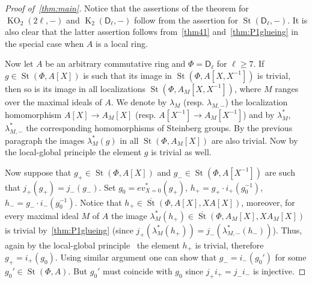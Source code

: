\documentclass[oneside, 8pt]{amsart}
\theoremstyle{remark}
\theoremstyle{definition}
\numberwithin{lemma}{section}
\numberwithin{prop}{section}
\numberwithin{corollary}{section}
\numberwithin{externaltheorem}{section}
\DeclareMathOperator{\St}{St}
\DeclareMathOperator{\K}{K}
\DeclareMathOperator{\KO}{KO}
\newcommand{\inv}{^{-1}}
\newcommand{\rD}{\mathsf{D}}
\numberwithin{equation}{section}
\begin{document}
\begin{proof}[Proof of~\cref{thm:main}]
 Notice that the assertions of the theorem for $\KO_2(2\ell, -)$ and $\K_2(\rD_\ell, -)$ follow from the assertion for $\St(\rD_\ell, -)$. It is also clear that the latter assertion follows from~\cref{thm41} and~\cref{thm:P1glueing} in the special case when $A$ is a local ring.
 
 Now let $A$ be an arbitrary commutative ring and $\Phi = \rD_\ell$ for $\ell \geq 7$. If $g \in \St(\Phi, A[X])$ is such that its image in $\St(\Phi, A[X, X\inv])$ is trivial, then so is its image in all localizations $\St(\Phi, A_M[X, X\inv])$, where $M$ ranges over the maximal ideals of $A$.
 We denote by $\lambda_{M}$ (resp. $\lambda_{M, -}$) the localization homomorphism $A[X] \to A_M[X]$ (resp. $A[X\inv] \to A_M[X\inv]$) and by $\lambda_M^*$, $\lambda_{M,-}^*$ the corresponding homomorphisms of Steinberg groups.
 By the previous paragraph the images $\lambda^*_M(g)$ in all $\St(\Phi, A_M[X])$ are also trivial. Now by the local-global principle \cite[Theorem~2]{LS17} the element $g$ is trivial as well.

 Now suppose that $g_+ \in \St(\Phi, A[X])$ and $g_- \in \St(\Phi, A[X\inv])$ are such that $j_+(g_+) = j_-(g_-)$. Set $g_0 = ev^*_{X=0}(g_+)$, $h_+ = g_+ \cdot i_+(g_0^{-1})$, $h_- = g_- \cdot i_-(g_0^{-1})$.
 Notice that $h_+ \in \overline{\St}(\Phi, A[X], XA[X])$, moreover, for every maximal ideal $M$ of $A$ the image $\lambda_M^*(h_+)\in \overline{\St}(\Phi, A_M[X], XA_M[X])$ is trivial by~\cref{thm:P1glueing}
  (since $j_+(\lambda^*_M(h_+)) = j_-(\lambda^*_{M,-}(h_-))$).
 Thus, again by the local-global principle~\cite[Theorem~2]{LS17} the element $h_+$ is trivial, therefore $g_+ = i_+(g_0)$.
 Using similar argument one can show that $g_- = i_-(g_0')$ for some $g_0' \in \St(\Phi, A)$. But $g_0'$ must coincide with $g_0$ since $j_+i_+ = j_-i_-$ is injective.
\end{proof}

\printbibliography
\end{document}
